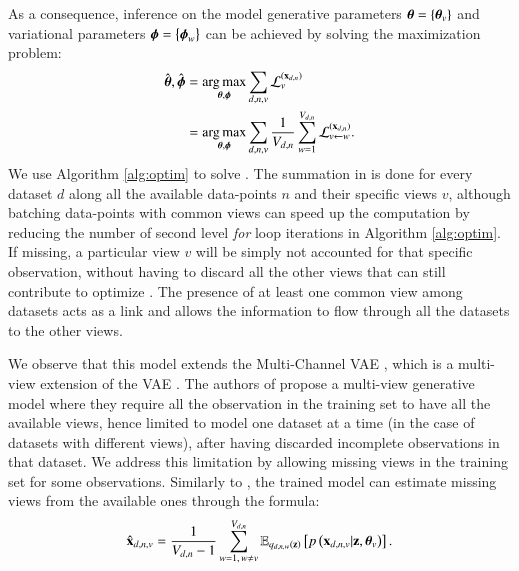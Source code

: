 As a consequence, inference on the model generative parameters $\boldsymbol{\theta} = \left\{\boldsymbol{\theta}_v\right\}$ and variational parameters $\boldsymbol{\phi} = \left\{\boldsymbol{\phi}_w\right\}$ can be achieved by solving the maximization problem:
\begin{equation}\label{eq:argmax}
\begin{aligned}
\hat{\boldsymbol{\theta}}, \hat{\boldsymbol{\phi}} &= \underset{\boldsymbol{\theta}, \boldsymbol{\phi}}{\operatorname{arg\,max}} \sum_{d,n,v} \mathcal{L}_v^{(\mathbf{x}_{d,n})} \\
                           &= \underset{\boldsymbol{\theta}, \boldsymbol{\phi}}{\operatorname{arg\,max}} \sum_{d,n,v} \frac{1}{V_{d,n}} \sum_{w=1}^{V_{d,n}} \mathcal{L}_{v \leftarrow w}^{(\mathbf{x}_{d,n})}.
\end{aligned}
\end{equation}
We use Algorithm \ref{alg:optim} to solve .
The summation in  is done for every dataset $d$ along all the available data-points $n$ and their specific views $v$, although batching data-points with common views can speed up the computation by reducing the number of second level \textit{for} loop iterations in Algorithm \ref{alg:optim}.
If missing, a particular view $v$ will be simply not accounted for that specific observation, without having to discard all the other views that can still contribute to optimize .
The presence of at least one common view among datasets acts as a link and allows the information to flow through all the datasets to the other views.

We observe that this model extends the Multi-Channel VAE \cite{Antelmi2019}, which is a multi-view extension of the VAE \cite{Kingma2013,Rezende2014}.
The authors of \cite{Antelmi2019} propose a multi-view generative model where they require all the observation in the training set to have all the available views, hence limited to model one dataset at a time (in the case of datasets with different views), after having discarded incomplete observations in that dataset.
We address this limitation by allowing missing views in the training set for some observations.
Similarly to \cite{Antelmi2019}, the trained model can estimate missing views from the available ones through the formula:
\begin{equation}\label{eq:reconstruction}
\begin{aligned}
\hat{\mathbf{x}}_{d,n,v} = \frac{1}{V_{d, n}-1} \sum_{w=1, \,w\neq v}^{V_{d, n}} \operatorname{\mathbb{E}}_{q_{d,n,w}(\mathbf{z})}\left[p\left(\mathbf{x}_{d,n,v}|\mathbf{z}, \boldsymbol{\theta}_v\right)\right].
\end{aligned}
\end{equation}

